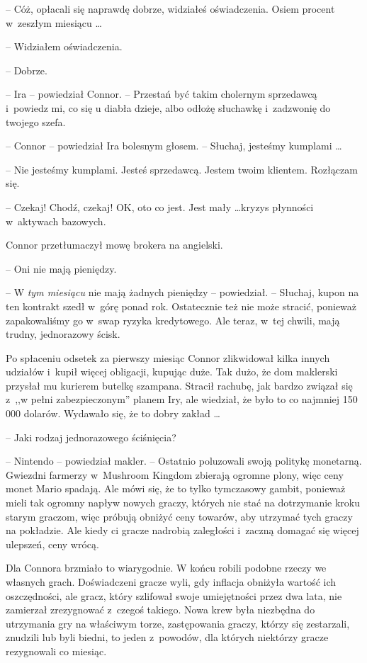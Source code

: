\documentclass[oneside,polish,11pt,rmheadings]{mwbk}
\begin{document}
-- Cóż, opłacali się naprawdę dobrze, widziałeś oświadczenia. Osiem procent w~zeszłym miesiącu \ldots 

-- Widziałem oświadczenia. 

-- Dobrze. 

-- Ira -- powiedział Connor. -- Przestań być takim cholernym sprzedawcą i~powiedz mi, co się u diabła dzieje, albo odłożę słuchawkę i~zadzwonię do twojego szefa.

-- Connor -- powiedział Ira bolesnym głosem. -- Słuchaj, jesteśmy kumplami \ldots  

-- Nie jesteśmy kumplami. Jesteś sprzedawcą. Jestem twoim klientem. Rozłączam się. 

-- Czekaj! Chodź, czekaj! OK, oto co jest. Jest mały \ldots  kryzys płynności w~aktywach bazowych. 

Connor przetłumaczył mowę brokera na angielski.

-- Oni nie mają pieniędzy.

-- W \textit{tym miesiącu }nie mają żadnych pieniędzy -- powiedział. -- Słuchaj, kupon na ten kontrakt szedł w~górę ponad rok. Ostatecznie też nie może stracić, ponieważ zapakowaliśmy go w~swap ryzyka kredytowego. Ale teraz, w~tej chwili, mają trudny, jednorazowy ścisk.

Po spłaceniu odsetek za pierwszy miesiąc Connor zlikwidował kilka innych udziałów i~kupił więcej obligacji, kupując duże. Tak dużo, że dom maklerski przysłał mu kurierem butelkę szampana. Stracił rachubę, jak bardzo związał się z~,,w pełni zabezpieczonym'' planem Iry, ale wiedział, że było to co najmniej 150 000 dolarów. Wydawało się, że to dobry zakład \ldots 

-- Jaki rodzaj jednorazowego ściśnięcia?

-- Nintendo -- powiedział makler. -- Ostatnio poluzowali swoją politykę monetarną. Gwiezdni farmerzy w~Mushroom Kingdom zbierają ogromne plony, więc ceny monet Mario spadają. Ale mówi się, że to tylko tymczasowy gambit, ponieważ mieli tak ogromny napływ nowych graczy, których nie stać na dotrzymanie kroku starym graczom, więc próbują obniżyć ceny towarów, aby utrzymać tych graczy na pokładzie. Ale kiedy ci gracze nadrobią zaległości i~zaczną domagać się więcej ulepszeń, ceny wrócą.

Dla Connora brzmiało to wiarygodnie. W końcu robili podobne rzeczy we własnych grach. Doświadczeni gracze wyli, gdy inflacja obniżyła wartość ich oszczędności, ale gracz, który szlifował swoje umiejętności przez dwa lata, nie zamierzał zrezygnować z~czegoś takiego. Nowa krew była niezbędna do utrzymania gry na właściwym torze, zastępowania graczy, którzy się zestarzali, znudzili lub byli biedni, to jeden z~powodów, dla których niektórzy gracze rezygnowali co miesiąc.
\end{document}
